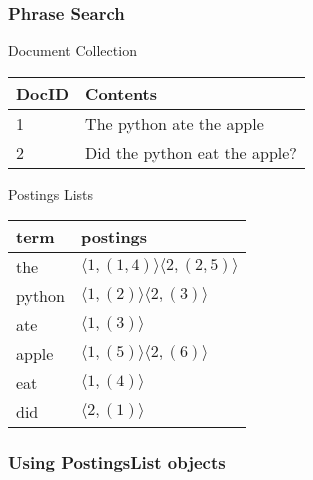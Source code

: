 \documentclass{beamer}
\begin{document}
\begin{frame}
  \frametitle{Phrase Search}




    \begin{block}{Document Collection}

    \begin{tabular}{ l | l }
      DocID & Contents \\ \hline
      1 & The python ate the apple \\
      2 & Did the python eat the apple? \\
    \end{tabular}

  \end{block}

  \begin{block}{Postings Lists}
    \begin{tabular}{ l | l }
      term & postings \\ \hline
      the & $ \langle 1,(1,4) \rangle \langle 2,(2,5) \rangle $ \\
      python & $ \langle 1,(2) \rangle \langle 2,(3) \rangle $ \\
      ate & $ \langle 1,(3) \rangle $ \\
      apple & $ \langle 1,(5) \rangle \langle 2,(6) \rangle $ \\
      eat & $ \langle 1,(4) \rangle $ \\
      did & $ \langle 2,(1) \rangle $ \\
    \end{tabular}
  \end{block}



\end{frame}


\begin{frame}
  \frametitle{Using PostingsList objects}

  \begin{example}
    \lstPostingsList
  \end{example}
\end{frame}
\end{document}
